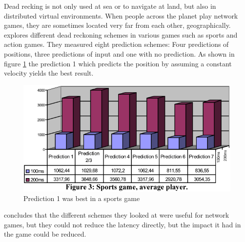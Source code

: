 Dead recking is not only used at sea or to navigate at land, but also in distributed virtual environments. When people across the planet play network games, they are sometimes located very far from each other, geographically. \cite{Pantel2002} explores different dead reckoning schemes in various games such as sports and action games. They measured eight prediction schemes: Four predictions of positions, three predictions of input and one with no prediction. As shown in figure \ref{fig:wolfpeperimage} the prediction 1 which predicts the position by assuming a constant velocity yields the best result.

\begin{figure}[H]
	\centering
	\includegraphics[width=0.5\linewidth]{positioning/positioning/wolfpeperImage}
	\caption{Prediction 1 was best in a sports game}
	\label{fig:wolfpeperimage}
\end{figure}

\cite{Pantel2002} concludes that the different schemes they looked at were useful for network games, but they could not reduce the latency directly, but the impact it had in the game could be reduced.